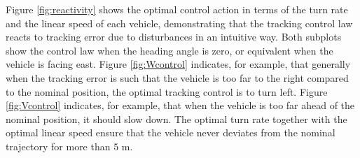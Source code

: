 Figure \ref{fig:reactivity} shows the optimal control action in terms of the turn rate and the linear speed of each vehicle, demonstrating that the tracking control law reacts to tracking error due to disturbances in an intuitive way. Both subplots show the control law when the heading angle is zero, or equivalent when the vehicle is facing east. Figure \ref{fig:Wcontrol} indicates, for example, that generally when the tracking error is such that the vehicle is too far to the right compared to the nominal position, the optimal tracking control is to turn left. Figure \ref{fig:Vcontrol} indicates, for example, that when the vehicle is too far ahead of the nominal position, it should slow down. The optimal turn rate together with the optimal linear speed ensure that the vehicle never deviates from the nominal trajectory for more than $5$ m.


